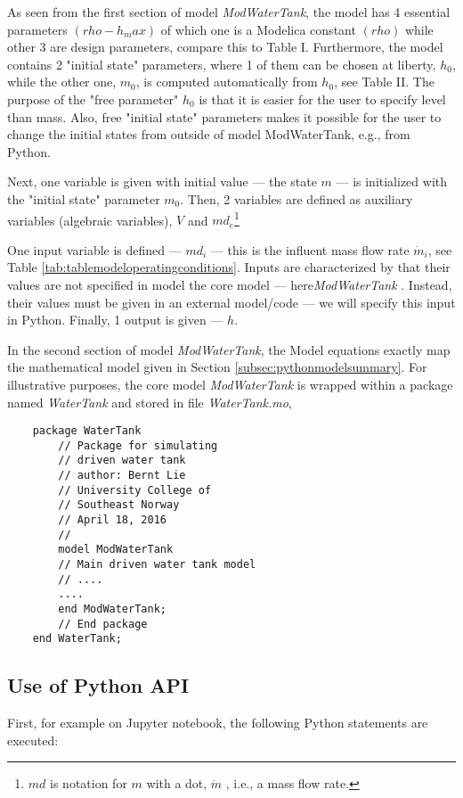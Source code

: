 As seen from the first section of model \textit{ModWaterTank}, the model has 4 essential parameters
$(rho-h_max)$ of which one is a Modelica constant $(rho)$ while other 3 are design parameters, compare this
to Table I. Furthermore, the model contains 2 "initial state" parameters, where 1 of them can be chosen at
liberty, $h_0$, while the other one, $m_0$, is computed automatically from $h_0$, see Table II. The purpose of
the "free parameter" $h_0$ is that it is easier for the user to specify level than mass. Also, free "initial state"
parameters makes it possible for the user to change the initial states from outside of model ModWaterTank, e.g., from Python.

Next, one variable is given with initial value — the state $m$ — is initialized with the "initial state" parameter
$m_0$. Then, 2 variables are defined as auxiliary variables (algebraic variables), $V$ and $md_e$\footnote{$md$ is notation for $m$ with a dot, $\dot{m}$ , i.e., a mass flow rate.}

One input variable is defined — $md_i$ — this is the influent mass flow rate $\dot{m}_i$, see Table \ref{tab:tablemodeloperatingconditions}. Inputs are
characterized by that their values are not specified in model the core model — here\textit{ModWaterTank} . Instead,
their values must be given in an external model/code — we will specify this input in Python. Finally, 1 output is
given — $h$.

In the second section of model \textit{ModWaterTank}, the Model equations exactly map the mathematical model
given in Section \ref{subsec:pythonmodelsummary}. For illustrative purposes, the core model \textit{ModWaterTank} is wrapped within a package named
\textit{WaterTank} and stored in file \textit{WaterTank.mo},


\begin{lstlisting}
	package WaterTank
		// Package for simulating
		// driven water tank
		// author: Bernt Lie
		// University College of
		// Southeast Norway
		// April 18, 2016
		//
		model ModWaterTank
		// Main driven water tank model
		// ....
		....
		end ModWaterTank;
		// End package
	end WaterTank;
\end{lstlisting}

\subsection{Use of Python API}
\label{subsec:pythonuseapi}

First, for example on Jupyter notebook, the following Python statements are executed:

